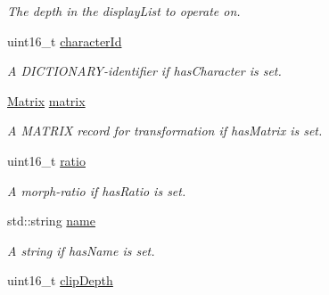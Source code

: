 \begin{DoxyCompactItemize}
\begin{DoxyCompactList}\small\item\em The depth in the {\ttfamily display\+List} to operate on. \end{DoxyCompactList}\item 
uint16\+\_\+t \hyperlink{classjswf_1_1flash_1_1tags_1_1_place_object2_tag_a01ac82d73c8ceb98c08b5c6ab46cf6d7}{character\+Id}
\begin{DoxyCompactList}\small\item\em A {\ttfamily D\+I\+C\+T\+I\+O\+N\+A\+R\+Y}-\/identifier if has\+Character is set. \end{DoxyCompactList}\item 
\hypertarget{classjswf_1_1flash_1_1tags_1_1_place_object2_tag_ac24772849adb35724494bde0086897d8}{\hyperlink{structjswf_1_1flash_1_1_matrix}{Matrix} \hyperlink{classjswf_1_1flash_1_1tags_1_1_place_object2_tag_ac24772849adb35724494bde0086897d8}{matrix}}\label{classjswf_1_1flash_1_1tags_1_1_place_object2_tag_ac24772849adb35724494bde0086897d8}

\begin{DoxyCompactList}\small\item\em A {\ttfamily M\+A\+T\+R\+I\+X} record for transformation if has\+Matrix is set. \end{DoxyCompactList}\item 
\hypertarget{classjswf_1_1flash_1_1tags_1_1_place_object2_tag_a84a89a2949f0ca405eda77efab6cd4cc}{uint16\+\_\+t \hyperlink{classjswf_1_1flash_1_1tags_1_1_place_object2_tag_a84a89a2949f0ca405eda77efab6cd4cc}{ratio}}\label{classjswf_1_1flash_1_1tags_1_1_place_object2_tag_a84a89a2949f0ca405eda77efab6cd4cc}

\begin{DoxyCompactList}\small\item\em A morph-\/ratio if has\+Ratio is set. \end{DoxyCompactList}\item 
\hypertarget{classjswf_1_1flash_1_1tags_1_1_place_object2_tag_a07dec53f40f2204656f5f6f997e71dc7}{std\+::string \hyperlink{classjswf_1_1flash_1_1tags_1_1_place_object2_tag_a07dec53f40f2204656f5f6f997e71dc7}{name}}\label{classjswf_1_1flash_1_1tags_1_1_place_object2_tag_a07dec53f40f2204656f5f6f997e71dc7}

\begin{DoxyCompactList}\small\item\em A string if has\+Name is set. \end{DoxyCompactList}\item 
\hypertarget{classjswf_1_1flash_1_1tags_1_1_place_object2_tag_a3c0066baea064460cee2bc4c868abd76}{uint16\+\_\+t \hyperlink{classjswf_1_1flash_1_1tags_1_1_place_object2_tag_a3c0066baea064460cee2bc4c868abd76}{clip\+Depth}}\label{classjswf_1_1flash_1_1tags_1_1_place_object2_tag_a3c0066baea064460cee2bc4c868abd76}


\end{DoxyCompactItemize}
